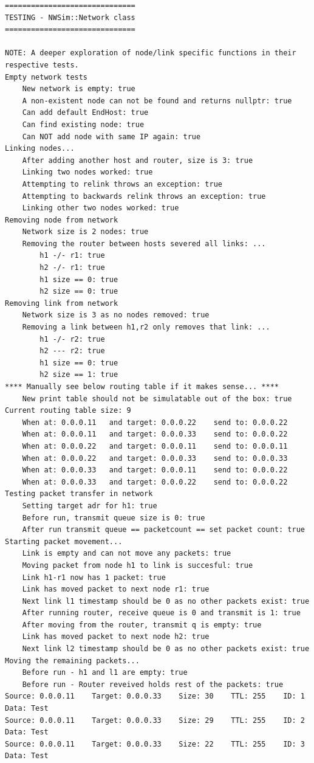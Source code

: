 \begin{lstlisting}
==============================
TESTING - NWSim::Network class
==============================

NOTE: A deeper exploration of node/link specific functions in their respective tests.
Empty network tests
	New network is empty: true
	A non-existent node can not be found and returns nullptr: true
	Can add default EndHost: true
	Can find existing node: true
	Can NOT add node with same IP again: true
Linking nodes...
	After adding another host and router, size is 3: true
	Linking two nodes worked: true
	Attempting to relink throws an exception: true
	Attempting to backwards relink throws an exception: true
	Linking other two nodes worked: true
Removing node from network
	Network size is 2 nodes: true
	Removing the router between hosts severed all links: ...
		h1 -/- r1: true
		h2 -/- r1: true
		h1 size == 0: true
		h2 size == 0: true
Removing link from network
	Network size is 3 as no nodes removed: true
	Removing a link between h1,r2 only removes that link: ...
		h1 -/- r2: true
		h2 --- r2: true
		h1 size == 0: true
		h2 size == 1: true
**** Manually see below routing table if it makes sense... ****
	New print table should not be simulatable out of the box: true
Current routing table size: 9
	When at: 0.0.0.11	and target: 0.0.0.22	send to: 0.0.0.22
	When at: 0.0.0.11	and target: 0.0.0.33	send to: 0.0.0.22
	When at: 0.0.0.22	and target: 0.0.0.11	send to: 0.0.0.11
	When at: 0.0.0.22	and target: 0.0.0.33	send to: 0.0.0.33
	When at: 0.0.0.33	and target: 0.0.0.11	send to: 0.0.0.22
	When at: 0.0.0.33	and target: 0.0.0.22	send to: 0.0.0.22
Testing packet transfer in network
	Setting target adr for h1: true
	Before run, transmit queue size is 0: true
	After run transmit queue == packetcount == set packet count: true
Starting packet movement...
	Link is empty and can not move any packets: true
	Moving packet from node h1 to link is succesful: true
	Link h1-r1 now has 1 packet: true
	Link has moved packet to next node r1: true
	Next link l1 timestamp should be 0 as no other packets exist: true
	After running router, receive queue is 0 and transmit is 1: true
	After moving from the router, transmit q is empty: true
	Link has moved packet to next node h2: true
	Next link l2 timestamp should be 0 as no other packets exist: true
Moving the remaining packets...
	Before run - h1 and l1 are empty: true
	Before run - Router reveived holds rest of the packets: true
Source: 0.0.0.11	Target: 0.0.0.33	Size: 30	TTL: 255	ID: 1	Data: Test
Source: 0.0.0.11	Target: 0.0.0.33	Size: 29	TTL: 255	ID: 2	Data: Test
Source: 0.0.0.11	Target: 0.0.0.33	Size: 22	TTL: 255	ID: 3	Data: Test

\end{lstlisting}
